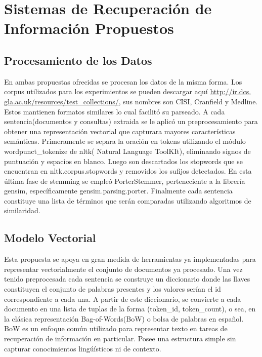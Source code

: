 \documentclass{llncs}
\begin{document}
\section{Sistemas de Recuperación de Información Propuestos}


\subsection{Procesamiento de los Datos}

En ambas propuestas ofrecidas se procesan los datos de la misma forma. Los corpus utilizados para los experimientos se pueden descargar aquí \href{http://ir.dcs.gla.ac.uk/resources/test_collections/} {http://ir.dcs. gla.ac.uk/resources/test\_collections/}, sus nombres son CISI, Cranfield y Medline. Estos mantienen formatos similares lo cual facilitó su parseado.
A cada sentencia(documentos y consultas) extraida se le aplicó un preprocesamiento para obtener una representación vectorial que capturara mayores características semánticas. Primeramente se separa la oración en tokens utilizando el módulo wordpunct\_tokenize de nltk( Natural Language ToolKIt), eliminando signos de puntuación y espacios en blanco. Luego son descartados los stopwords que se encuentran en nltk.corpus.stopwords y removidos los sufijos detectados. En esta última fase de stemming se empleó PorterStemmer, perteneciente a la librería gensim, específicamente gensim.parsing.porter. Finalmente cada sentencia constituye una lista de términos que serán comparadas utilizando algoritmos de similaridad.

\subsection{Modelo Vectorial}

Esta propuesta se apoya en gran medida de herramientas ya implementadas para representar vectorialmente el conjunto de documentos ya procesado. Una vez tenido preprocesada cada sentencia se construye un diccionario donde las llaves constituyen el conjunto de palabras presentes y los valores serían el id correspondiente a cada una. A partir de este diccionario, se convierte a cada documento en una lista de tuplas de la forma (token_id, token_count), o sea, en la clásica representación Bag-of-Words(BoW) o bolsa de palabras en español. BoW es un enfoque común utilizado para representar texto en tareas de recuperación de información en particular. Posee una estructura simple sin capturar conocimientos lingúísticos ni de contexto.
\end{document}
